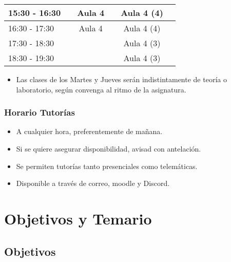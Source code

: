 \documentclass[a4paper,t,xcolor=pst,dvips,colortheme]{beamer}
\begin{document}
\begin{frame}[c]
\begin{small}
{\begin{center}
\begin{tabular}{||l|c|c|c|c|c||}
        15:30 - 16:30  &       & Aula 4  &           & Aula 4 (4) &         \\ \hline
        16:30 - 17:30  &       & Aula 4  &           & Aula 4 (4) &         \\ \hline
    	17:30 - 18:30  &       &         &           & Aula 4 (3) &         \\ \hline
        18:30 - 19:30  &       &         &           & Aula 4 (3) &         \\ \hline
        \hline
    	\end{tabular}
    	\end{center}
    }
	\end{small}
	\begin{itemize}
        \item<3-> Las clases de los Martes y Jueves serán indistintamente de teoría o laboratorio, según convenga al ritmo de la asignatura.
	\end{itemize}
\end{frame}

\begin{frame}[c]
	\frametitle{Horario Tutorías}
    \begin{itemize}[<+->]
        \item A cualquier hora, preferentemente de mañana.
        \item Si se quiere asegurar disponibilidad, avisad con antelación.
        \item Se permiten tutorías tanto presenciales como telemáticas.
        \item Disponible a través de correo, moodle y \alert{Discord}.
	\end{itemize}
\end{frame}

\section{Objetivos y Temario}

\subsection{Objetivos}
\end{document}
